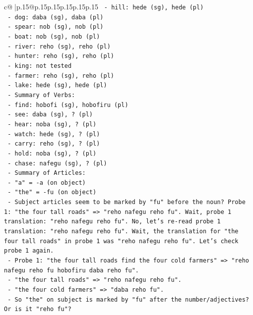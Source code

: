 \documentclass{article}
\begin{document}
{\begin{supertabular}{c@{$\;$}|p{.15\linewidth}@{}p{.15\linewidth}p{.15\linewidth}p{.15\linewidth}p{.15\linewidth}p{.15\linewidth}}
{{{\texttt{        {-} hill: hede (sg), hede (pl)} \\
\texttt{        {-} dog: daba (sg), daba (pl)} \\
\texttt{        {-} spear: nob (sg), nob (pl)} \\
\texttt{        {-} boat: nob (sg), nob (pl)} \\
\texttt{        {-} river: reho (sg), reho (pl)} \\
\texttt{        {-} hunter: reho (sg), reho (pl)} \\
\texttt{        {-} king: not tested} \\
\texttt{        {-} farmer: reho (sg), reho (pl)} \\
\texttt{        {-} lake: hede (sg), hede (pl)} \\
\texttt{    {-} Summary of Verbs:} \\
\texttt{        {-} find: hobofi (sg), hobofiru (pl)} \\
\texttt{        {-} see: daba (sg), ? (pl)} \\
\texttt{        {-} hear: noba (sg), ? (pl)} \\
\texttt{        {-} watch: hede (sg), ? (pl)} \\
\texttt{        {-} carry: reho (sg), ? (pl)} \\
\texttt{        {-} hold: noba (sg), ? (pl)} \\
\texttt{        {-} chase: nafegu (sg), ? (pl)} \\
\texttt{    {-} Summary of Articles:} \\
\texttt{        {-} "a" = {-}a (on object)} \\
\texttt{        {-} "the" = {-}fu (on object)} \\
\texttt{        {-} Subject articles seem to be marked by "fu" before the noun? Probe 1: "the four tall roads" => "reho nafegu reho fu". Wait, probe 1 translation: "reho nafegu reho fu". No, let's re{-}read probe 1 translation: "reho nafegu reho fu". Wait, the translation for "the four tall roads" in probe 1 was "reho nafegu reho fu". Let's check probe 1 again.} \\
\texttt{        {-} Probe 1: "the four tall roads find the four cold farmers" => "reho nafegu reho fu hobofiru daba reho fu".} \\
\texttt{        {-} "the four tall roads" => "reho nafegu reho fu".} \\
\texttt{        {-} "the four cold farmers" => "daba reho fu".} \\
\texttt{        {-} So "the" on subject is marked by "fu" after the number/adjectives? Or is it "reho fu"?} \\
}}}
\end{supertabular}}
\end{document}

